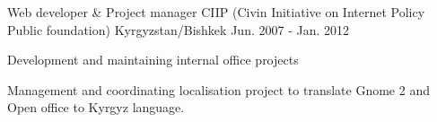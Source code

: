 \begin{cventries}
  \cventry
    {Web developer \& Project manager}
    {CIIP (Civin Initiative on Internet Policy Public foundation)}
    {Kyrgyzstan/Bishkek}
    {Jun. 2007 - Jan. 2012}
    {
      \begin{cvitems}
        \item {Development and maintaining internal office projects}
        \item {Management and coordinating localisation project to translate Gnome 2 and Open office to Kyrgyz language.}
      \end{cvitems}
    }
\end{cventries}
